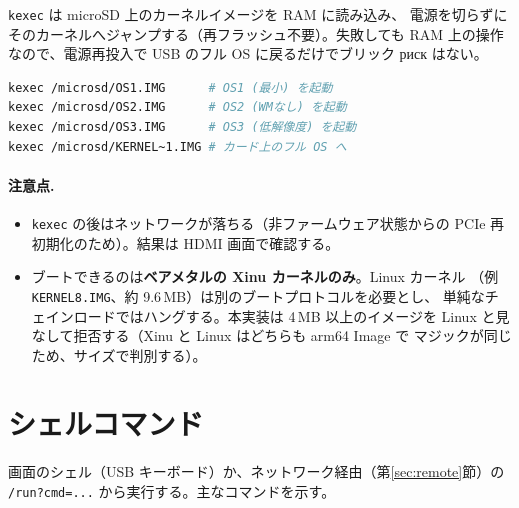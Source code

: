 \documentclass[a4paper,11pt]{ltjsarticle}
\begin{document}
\texttt{kexec} は microSD 上のカーネルイメージを RAM に読み込み、
電源を切らずにそのカーネルへジャンプする（再フラッシュ不要）。失敗しても
RAM 上の操作なので、電源再投入で USB のフル OS に戻るだけでブリック риск はない。

\begin{lstlisting}[language=bash]
kexec /microsd/OS1.IMG      # OS1 (最小) を起動
kexec /microsd/OS2.IMG      # OS2 (WMなし) を起動
kexec /microsd/OS3.IMG      # OS3 (低解像度) を起動
kexec /microsd/KERNEL~1.IMG # カード上のフル OS へ
\end{lstlisting}

\paragraph{注意点.}
\begin{itemize}[noitemsep]
  \item \texttt{kexec} の後はネットワークが落ちる（非ファームウェア状態からの
        PCIe 再初期化のため）。結果は HDMI 画面で確認する。
  \item ブートできるのは\textbf{ベアメタルの Xinu カーネルのみ}。Linux カーネル
        （例 \texttt{KERNEL8.IMG}、約 9.6\,MB）は別のブートプロトコルを必要とし、
        単純なチェインロードではハングする。本実装は 4\,MB 以上のイメージを
        Linux と見なして拒否する（Xinu と Linux はどちらも arm64 Image で
        マジックが同じため、サイズで判別する）。
\end{itemize}

\section{シェルコマンド}
画面のシェル（USB キーボード）か、ネットワーク経由（第\ref{sec:remote}節）の
\texttt{/run?cmd=...} から実行する。主なコマンドを示す。
\end{document}
